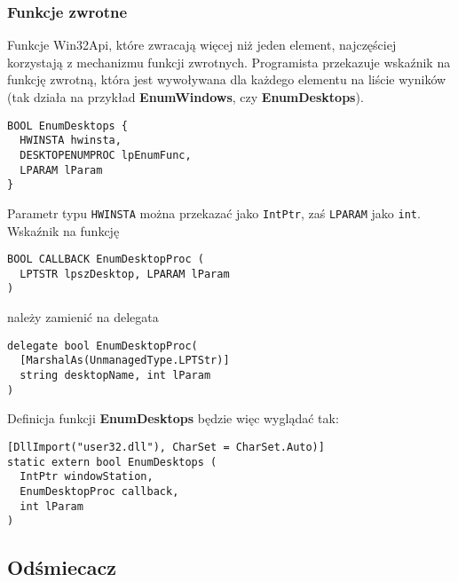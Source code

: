 \subsubsection{Funkcje zwrotne}

Funkcje Win32Api, które zwracają więcej niż jeden element, najczęściej korzystają z mechanizmu funkcji
zwrotnych. Programista przekazuje wskaźnik na funkcję zwrotną, która jest wywoływana dla każdego elementu
na liście wyników (tak działa na przykład {\bf EnumWindows}, czy {\bf EnumDesktops}).

\begin{scriptsize}
\begin{verbatim}
BOOL EnumDesktops {
  HWINSTA hwinsta,  
  DESKTOPENUMPROC lpEnumFunc,
  LPARAM lParam
}
\end{verbatim}
\end{scriptsize}

Parametr typu {\tt HWINSTA} można przekazać jako {\tt IntPtr}, zaś {\tt LPARAM} jako {\tt int}.
Wskaźnik na funkcję

\begin{scriptsize}
\begin{verbatim}
BOOL CALLBACK EnumDesktopProc (
  LPTSTR lpszDesktop, LPARAM lParam
)
\end{verbatim}
\end{scriptsize}

należy zamienić na delegata

\begin{scriptsize}
\begin{verbatim}
delegate bool EnumDesktopProc(
  [MarshalAs(UnmanagedType.LPTStr)]
  string desktopName, int lParam
)
\end{verbatim}
\end{scriptsize}

Definicja funkcji {\bf EnumDesktops} będzie więc wyglądać tak:

\begin{scriptsize}
\begin{verbatim}
[DllImport("user32.dll"), CharSet = CharSet.Auto)]
static extern bool EnumDesktops (
  IntPtr windowStation,
  EnumDesktopProc callback,
  int lParam
)
\end{verbatim}
\end{scriptsize}

\subsection{Odśmiecacz}

